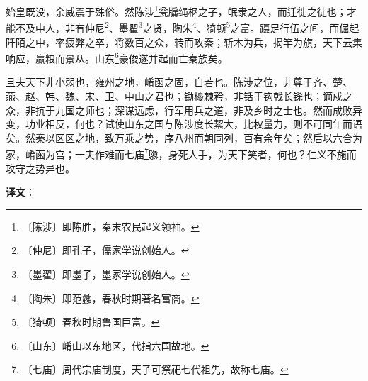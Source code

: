 \documentclass[12pt,UTF-8,openany]{ctexbook}
\begin{document}
\begin{normalsize}
    始皇既没，余威震于殊俗。然陈涉\footnote{〔陈涉〕即陈胜，秦末农民起义领袖。}瓮牖绳枢之子，氓隶之人，而迁徙之徒也；才能不及中人，非有仲尼\footnote{〔仲尼〕即孔子，儒家学说创始人。}、墨翟\footnote{〔墨翟〕即墨子，墨家学说创始人。}之贤，陶朱\footnote{〔陶朱〕即范蠡，春秋时期著名富商。}、猗顿\footnote{〔猗顿〕春秋时期鲁国巨富。}之富。蹑足行伍之间，而倔起阡陌之中，率疲弊之卒，将数百之众，转而攻秦；斩木为兵，揭竿为旗，天下云集响应，赢粮而景从。山东\footnote{〔山东〕崤山以东地区，代指六国故地。}豪俊遂并起而亡秦族矣。
    
    且夫天下非小弱也，雍州之地，崤函之固，自若也。陈涉之位，非尊于齐、楚、燕、赵、韩、魏、宋、卫、中山之君也；锄櫌棘矜，非铦于钩戟长铩也；谪戍之众，非抗于九国之师也；深谋远虑，行军用兵之道，非及乡时之士也。然而成败异变，功业相反，何也？试使山东之国与陈涉度长絜大，比权量力，则不可同年而语矣。然秦以区区之地，致万乘之势，序八州而朝同列，百有余年矣；然后以六合为家，崤函为宫；一夫作难而七庙\footnote{〔七庙〕周代宗庙制度，天子可祭祀七代祖先，故称七庙。}隳，身死人手，为天下笑者，何也？仁义不施而攻守之势异也。
\end{normalsize}


\newpage

\textbf{译文}：

\vspace{1em}
\end{document}
